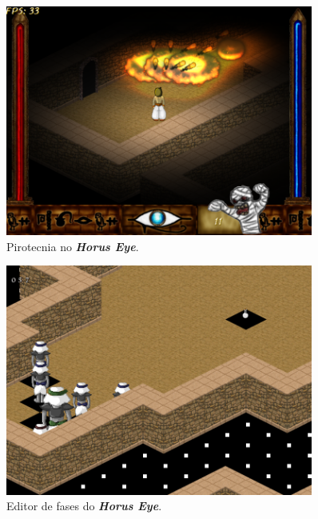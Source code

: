 \documentclass[12pt,onecolumn,a4paper]{article}
\begin{document}
        \begin{figure}[htb]
            \centering
            \includegraphics[width=0.9\textwidth]{images/horus_05.png}
            \caption{Pirotecnia no \textit{\textbf{Horus Eye}}.}
            \label{fig:horus_05}
        \end{figure}
        
        \begin{figure}[htb]
            \centering
            \includegraphics[width=0.9\textwidth]{images/horus_06.png}
            \caption{Editor de fases do \textit{\textbf{Horus Eye}}.}
            \label{fig:horus_06}
        \end{figure}
        
        \clearpage
        
\end{document}
